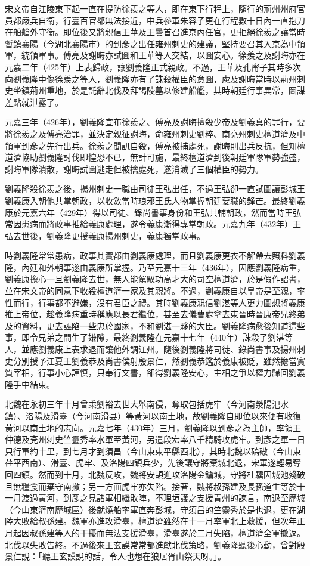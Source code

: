 宋文帝自江陵東下起一直在提防徐羨之等人，即在東下行程上，隨行的荊州州府官員都嚴兵自衞，行臺百官都無法接近，中兵參軍朱容子更在行程數十日內一直抱刀在船艙外守衞。即位後又將親信王華及王曇首召進京內任官，更拒絕徐羨之讓當時暫鎮襄陽（今湖北襄陽市）的到彥之出任雍州刺史的建議，堅持要召其入京為中領軍，統領軍事。傅亮及謝晦亦試圖和王華等人交結，以圖安心。徐羨之及謝晦亦在元嘉二年（425年）上表歸政，讓劉義隆正式親政。不過，王華及孔甯子其時多次向劉義隆中傷徐羨之等人，劉義隆亦有了誅殺權臣的意圖，慮及謝晦當時以荊州刺史坐鎮荊州重地，於是託辭北伐及拜謁陵墓以修建船艦，其時朝廷行事異常，圖謀差點就泄露了。

元嘉三年（426年），劉義隆宣布徐羨之、傅亮及謝晦擅殺少帝及劉義真的罪行，要將徐羨之及傅亮治罪，並決定親征謝晦，命雍州刺史劉粹、南兗州刺史檀道濟及中領軍到彥之先行出兵。徐羨之聞訊自殺，傅亮被捕處死，謝晦則出兵反抗，但知檀道濟協助劉義隆討伐即惶恐不已，無計可施，最終檀道濟到後朝廷軍隊軍勢強盛，謝晦軍隊潰散，謝晦試圖逃走但被擒處死，遂消滅了三個權臣的勢力。

劉義隆殺徐羨之後，揚州刺史一職由司徒王弘出任，不過王弘卻一直試圖讓彭城王劉義康入朝他共掌朝政，以收斂當時琅邪王氏人物掌握朝廷要職的鋒芒。最終劉義康於元嘉六年（429年）得以司徒、錄尚書事身份和王弘共輔朝政，然而當時王弘常因患病而將政事推給義康處理，遂令義康漸得專掌朝政。元嘉九年（432年）王弘去世後，劉義隆更授義康揚州刺史，義康獨掌政事。

時劉義隆常常患病，政事其實都由劉義康處理，而且劉義康更衣不解帶去照料劉義隆，內廷和外朝事遂由義康所掌握。乃至元嘉十三年（436年），因應劉義隆病重，劉義康擔心一旦劉義隆去世，無人能駕馭功高才大的司空檀道濟，於是假作詔書，並在宋文帝的同意下收殺檀道濟一家及其親將。不過，劉義康自以皇帝是至親，率性而行，行事都不避嫌，沒有君臣之禮。其時劉義康親信劉湛等人更力圖想將義康推上帝位，趁義隆病重時稱應以長君繼位，甚至去儀曹處拿去東晉時晉康帝兄終弟及的資料，更去誣陷一些忠於國家，不和劉湛一夥的大臣。劉義隆病愈後知道這些事，即令兄弟之間生了嫌隙，最終劉義隆在元嘉十七年（440年）誅殺了劉湛等人，並應劉義康上表求退而讓他外調江州。隨後劉義隆將司徒、錄尚書事及揚州刺史分別授予江夏王劉義恭及尚書僕射殷景仁，然劉義恭鑑於義康被貶，雖然擔當實質宰相，行事小心謹慎，只奉行文書，卻得劉義隆安心，主相之爭以權力歸回劉義隆手中結束。

北魏在永初三年十月曾乘劉裕去世大舉南侵，奪取包括虎牢（今河南滎陽汜水鎮）、洛陽及滑臺（今河南滑县）等黃河以南土地，故劉義隆自即位以來便有收復黃河以南土地的志向。元嘉七年（430年）三月，劉義隆以到彥之為主帥，率領王仲德及兗州刺史竺靈秀率水軍至黃河，另遣段宏率八千精騎攻虎牢。到彥之軍一日只行軍約十里，到七月才到須昌（今山東東平縣西北），其時北魏以碻磝（今山東荏平西南）、滑臺、虎牢、及洛陽四鎮兵少，先後讓守將棄城北退，宋軍遂輕易奪回四鎮。然而到十月，北魏反攻，魏將安頡進攻洛陽金鏞城，守將杜驥因城池殘破且無糧食而棄守南撤；另一方面虎牢亦失陷。接著，魏將叔孫建及長孫道生等於十一月渡過黃河，到彥之見諸軍相繼敗陣，不理垣護之支援青州的諫言，南退至歷城（今山東濟南歷城區）後就燒船率軍直奔彭城，守須昌的竺靈秀於是也退，更在湖陸大敗給叔孫建。魏軍亦進攻滑臺，檀道濟雖然在十一月率軍北上救援，但次年正月起因叔孫建等人的干擾而無法支援滑臺，滑臺遂於二月失陷，檀道濟全軍撤返。北伐以失敗告終。不過後來王玄謨常常都進獻北伐策略，劉義隆聽後心動，曾對殷景仁說：「聽王玄謨說的話，令人也想在狼居胥山祭天呀。」。

